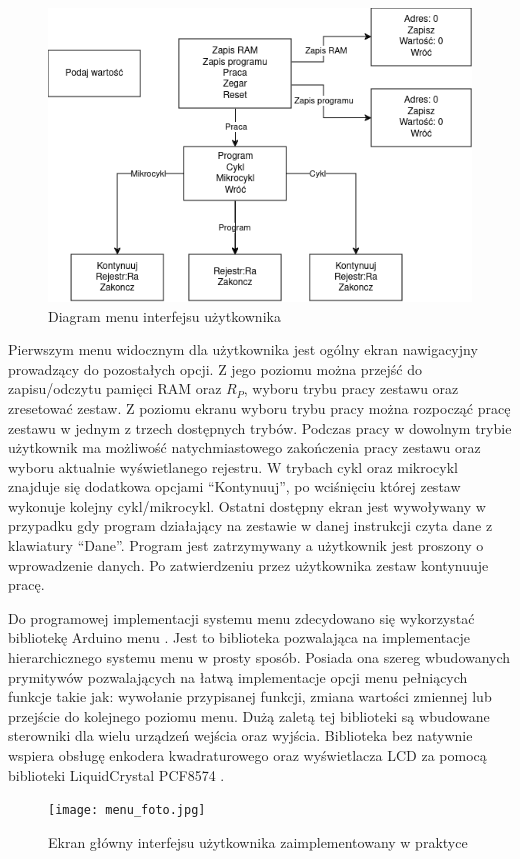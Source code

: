 \documentclass[../main.tex]{subfiles}
\begin{document}
    \begin{figure}[H]
        \centering
        \includegraphics[scale=0.6]{menu_diagram.png}
        \caption{Diagram menu interfejsu użytkownika}
        \label{fig:menu_diagram}
    \end{figure}

    Pierwszym menu widocznym dla użytkownika jest ogólny ekran nawigacyjny prowadzący do pozostałych opcji. Z jego poziomu można przejść
    do zapisu/odczytu pamięci RAM oraz $R_P$, wyboru trybu pracy zestawu oraz zresetować zestaw. Z poziomu ekranu wyboru trybu pracy można 
    rozpocząć pracę zestawu w jednym z trzech dostępnych trybów. Podczas pracy w dowolnym trybie użytkownik ma możliwość natychmiastowego 
    zakończenia pracy zestawu oraz wyboru aktualnie wyświetlanego rejestru. W trybach cykl oraz mikrocykl znajduje się dodatkowa opcjami
    ``Kontynuuj'', po wciśnięciu której zestaw wykonuje kolejny cykl/mikrocykl. Ostatni dostępny ekran jest wywoływany w przypadku
    gdy program działający na zestawie w danej instrukcji czyta dane z klawiatury ``Dane''. Program jest zatrzymywany a użytkownik jest proszony
    o wprowadzenie danych. Po zatwierdzeniu przez użytkownika zestaw kontynuuje pracę.
    \par
    Do programowej implementacji systemu menu zdecydowano się wykorzystać bibliotekę Arduino menu \cite{arduino_menu}. Jest to biblioteka
    pozwalająca na implementacje hierarchicznego systemu menu w prosty sposób. Posiada ona szereg wbudowanych prymitywów pozwalających
    na łatwą implementacje opcji menu pełniących funkcje takie jak: wywołanie przypisanej funkcji, zmiana wartości zmiennej lub przejście
    do kolejnego poziomu menu. Dużą zaletą tej biblioteki są wbudowane sterowniki dla wielu urządzeń wejścia oraz wyjścia. Biblioteka 
    bez natywnie wspiera obsługę enkodera kwadraturowego oraz wyświetlacza LCD za pomocą biblioteki LiquidCrystal PCF8574 \cite{lcd_pcf8574}.

    \begin{figure}[H]
        \centering
        \texttt{[image: menu\_foto.jpg]}
        \caption{Ekran główny interfejsu użytkownika zaimplementowany w praktyce}
        \label{fig:menu_foto}
    \end{figure}
\end{document}
